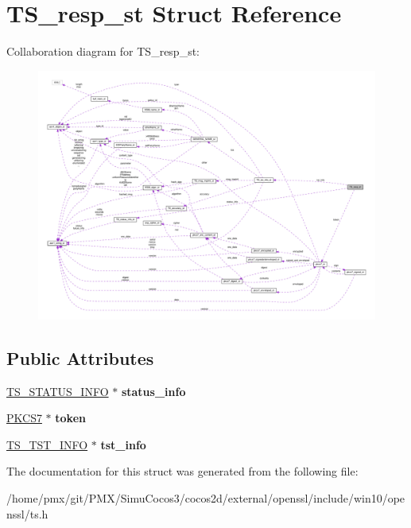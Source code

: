 \hypertarget{structTS__resp__st}{}\section{T\+S\+\_\+resp\+\_\+st Struct Reference}
\label{structTS__resp__st}


Collaboration diagram for T\+S\+\_\+resp\+\_\+st\+:
\nopagebreak
\begin{figure}[H]
\begin{center}
\leavevmode
\includegraphics[width=350pt]{structTS__resp__st__coll__graph}
\end{center}
\end{figure}
\subsection*{Public Attributes}
\begin{DoxyCompactItemize}
\item 
\mbox{\label{structTS__resp__st_a9bd656baceb73a81e2cb3b41799c8dc0}} 
\hyperlink{structTS__status__info__st}{T\+S\+\_\+\+S\+T\+A\+T\+U\+S\+\_\+\+I\+N\+FO} $\ast$ {\bfseries status\+\_\+info}
\item 
\mbox{\label{structTS__resp__st_afaf455ead8fb6b4c236f8c6c28eb458d}} 
\hyperlink{structpkcs7__st}{P\+K\+C\+S7} $\ast$ {\bfseries token}
\item 
\mbox{\label{structTS__resp__st_a79930775dd736e54ec3b762292e654e6}} 
\hyperlink{structTS__tst__info__st}{T\+S\+\_\+\+T\+S\+T\+\_\+\+I\+N\+FO} $\ast$ {\bfseries tst\+\_\+info}
\end{DoxyCompactItemize}


The documentation for this struct was generated from the following file\+:\begin{DoxyCompactItemize}
\item 
/home/pmx/git/\+P\+M\+X/\+Simu\+Cocos3/cocos2d/external/openssl/include/win10/openssl/ts.\+h\end{DoxyCompactItemize}
